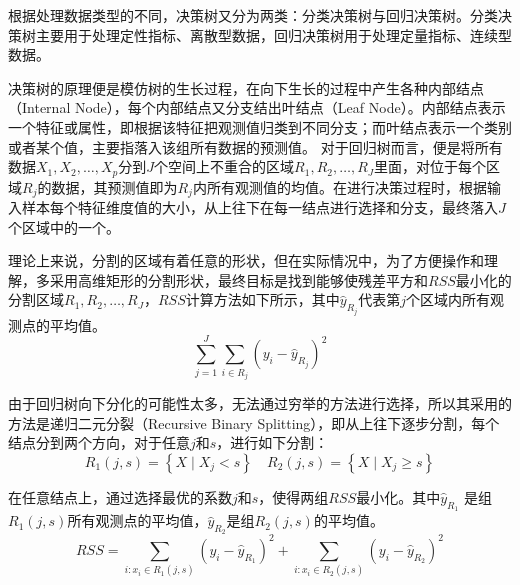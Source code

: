 根据处理数据类型的不同，决策树又分为两类：分类决策树与回归决策树。分类决策树主要用于处理定性指标、离散型数据，回归决策树用于处理定量指标、连续型数据。

决策树的原理便是模仿树的生长过程，在向下生长的过程中产生各种内部结点（Internal Node），每个内部结点又分支结出叶结点（Leaf Node）。内部结点表示一个特征或属性，即根据该特征把观测值归类到不同分支；而叶结点表示一个类别或者某个值，主要指落入该组所有数据的预测值。
对于回归树而言，便是将所有数据$X_1, X_2, \ldots, X_p$分到$J$个空间上不重合的区域$R_1, R_2, \ldots, R_J$里面，对位于每个区域$R_j$的数据，其预测值即为$R_j$内所有观测值的均值。在进行决策过程时，根据输入样本每个特征维度值的大小，从上往下在每一结点进行选择和分支，最终落入$J$个区域中的一个。

理论上来说，分割的区域有着任意的形状，但在实际情况中，为了方便操作和理解，多采用高维矩形的分割形状，最终目标是找到能够使残差平方和$RSS$最小化的分割区域$R_1, R_2, \ldots, R_J$，$RSS$计算方法如下所示，其中$\hat{y}_{R_{j}}$代表第$j$个区域内所有观测点的平均值。
$$\sum_{j=1}^{J} \sum_{i \in R_{j}}\left(y_{i}-\hat{y}_{R_{j}}\right)^{2}$$

由于回归树向下分化的可能性太多，无法通过穷举的方法进行选择，所以其采用的方法是递归二元分裂（Recursive Binary Splitting），即从上往下逐步分割，每个结点分到两个方向，对于任意$j$和$s$，进行如下分割：
$$
R_{1}(j, s)=\left\{X \mid X_{j}<s\right\} \quad R_{2}(j, s)=\left\{X \mid X_{j} \geq s\right\}
$$

在任意结点上，通过选择最优的系数$j$和$s$，使得两组$RSS$最小化。其中$\hat{y}_{R_{1}}$ 是组$R_{1}(j, s)$所有观测点的平均值，$\hat{y}_{R_{2}}$是组$R_{2}(j, s)$的平均值。
$$
RSS = \sum_{i: x_{i} \in R_{1}(j, s)}\left(y_{i}-\hat{y}_{R_{1}}\right)^{2}+\sum_{i: x_{i} \in R_{2}(j, s)}\left(y_{i}-\hat{y}_{R_{2}}\right)^{2}
$$

